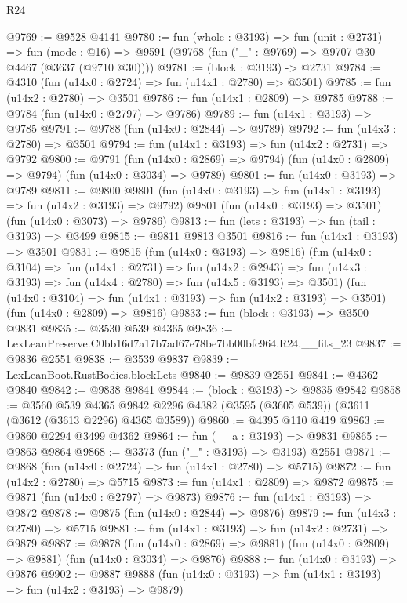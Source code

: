 \begin{lexlean}{R24}
\begin{coremodule}
@9769 := @9528 @4141
@9780 := fun (whole : @3193) =>
  fun (unit : @2731) =>
  fun (mode : @16) => @9591 (@9768 (fun ("_" : @9769) => @9707 @30 @4467 (@3637 (@9710 @30))))
@9781 := (block : @3193) -> @2731
@9784 := @4310 (fun (u14x0 : @2724) => fun (u14x1 : @2780) => @3501)
@9785 := fun (u14x2 : @2780) => @3501
@9786 := fun (u14x1 : @2809) => @9785
@9788 := @9784 (fun (u14x0 : @2797) => @9786)
@9789 := fun (u14x1 : @3193) => @9785
@9791 := @9788 (fun (u14x0 : @2844) => @9789)
@9792 := fun (u14x3 : @2780) => @3501
@9794 := fun (u14x1 : @3193) => fun (u14x2 : @2731) => @9792
@9800 := @9791
    (fun (u14x0 : @2869) => @9794)
    (fun (u14x0 : @2809) => @9794)
    (fun (u14x0 : @3034) => @9789)
@9801 := fun (u14x0 : @3193) => @9789
@9811 := @9800
    @9801
    (fun (u14x0 : @3193) => fun (u14x1 : @3193) => fun (u14x2 : @3193) => @9792)
    @9801
    (fun (u14x0 : @3193) => @3501)
    (fun (u14x0 : @3073) => @9786)
@9813 := fun (lets : @3193) => fun (tail : @3193) => @3499
@9815 := @9811 @9813 @3501
@9816 := fun (u14x1 : @3193) => @3501
@9831 := @9815
    (fun (u14x0 : @3193) => @9816)
    (fun (u14x0 : @3104) =>
    fun (u14x1 : @2731) =>
    fun (u14x2 : @2943) =>
    fun (u14x3 : @3193) => fun (u14x4 : @2780) => fun (u14x5 : @3193) => @3501)
    (fun (u14x0 : @3104) => fun (u14x1 : @3193) => fun (u14x2 : @3193) => @3501)
    (fun (u14x0 : @2809) => @9816)
@9833 := fun (block : @3193) => @3500 @9831
@9835 := @3530 @539 @4365
@9836 := LexLeanPreserve.C0bb16d7a17b7ad67e78be7bb00bfc964.R24.__fits_23
@9837 := @9836 @2551
@9838 := @3539 @9837
@9839 := LexLeanBoot.RustBodies.blockLets
@9840 := @9839 @2551
@9841 := @4362 @9840
@9842 := @9838 @9841
@9844 := (block : @3193) -> @9835 @9842
@9858 := @3560
    @539
    @4365
    @9842
    @2296
    @4382
    (@3595 (@3605 @539))
    (@3611 (@3612 (@3613 @2296) @4365 @3589))
@9860 := @4395 @110 @419
@9863 := @9860 @2294 @3499 @4362
@9864 := fun (__a : @3193) => @9831
@9865 := @9863 @9864
@9868 := @3373 (fun ("_" : @3193) => @3193) @2551
@9871 := @9868 (fun (u14x0 : @2724) => fun (u14x1 : @2780) => @5715)
@9872 := fun (u14x2 : @2780) => @5715
@9873 := fun (u14x1 : @2809) => @9872
@9875 := @9871 (fun (u14x0 : @2797) => @9873)
@9876 := fun (u14x1 : @3193) => @9872
@9878 := @9875 (fun (u14x0 : @2844) => @9876)
@9879 := fun (u14x3 : @2780) => @5715
@9881 := fun (u14x1 : @3193) => fun (u14x2 : @2731) => @9879
@9887 := @9878
    (fun (u14x0 : @2869) => @9881)
    (fun (u14x0 : @2809) => @9881)
    (fun (u14x0 : @3034) => @9876)
@9888 := fun (u14x0 : @3193) => @9876
@9902 := @9887
    @9888
    (fun (u14x0 : @3193) => fun (u14x1 : @3193) => fun (u14x2 : @3193) => @9879)

\end{coremodule}
\end{lexlean}
